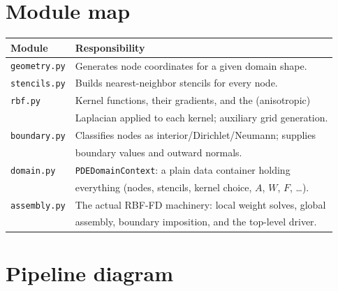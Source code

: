 \documentclass[11pt]{article}
\begin{document}
\section{Module map}

\begin{center}
\begin{tabular}{@{}ll@{}}
\toprule
\textbf{Module} & \textbf{Responsibility} \\
\midrule
\texttt{geometry.py} & Generates node coordinates for a given domain shape. \\
\texttt{stencils.py} & Builds nearest-neighbor stencils for every node. \\
\texttt{rbf.py} & Kernel functions, their gradients, and the (anisotropic) \\
                & Laplacian applied to each kernel; auxiliary grid generation. \\
\texttt{boundary.py} & Classifies nodes as interior/Dirichlet/Neumann; supplies \\
                      & boundary values and outward normals. \\
\texttt{domain.py} & \texttt{PDEDomainContext}: a plain data container holding \\
                    & everything (nodes, stencils, kernel choice, $A$, $W$, $F$, \dots). \\
\texttt{assembly.py} & The actual RBF-FD machinery: local weight solves, global \\
                      & assembly, boundary imposition, and the top-level driver. \\
\bottomrule
\end{tabular}
\end{center}

\section{Pipeline diagram}
\end{document}
